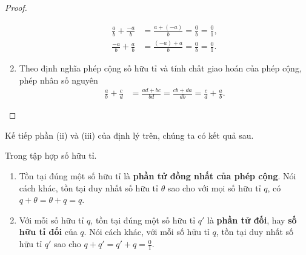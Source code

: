 \begin{proof}
\begin{enumerate}[label={(\roman*)}]
              \begin{align*}
                  \frac{a}{b} + \frac{-a}{b} & = \frac{a + (-a)}{b} = \frac{0}{b} = \frac{0}{1}, \\
                  \frac{-a}{b} + \frac{a}{b} & = \frac{(-a) + a}{b} = \frac{0}{b} = \frac{0}{1}.
              \end{align*}
        \item Theo định nghĩa phép cộng số hữu tỉ và tính chất giao hoán của phép cộng, phép nhân số nguyên
              \begin{align*}
                  \frac{a}{b} + \frac{c}{d} & = \frac{ad + bc}{bd} = \frac{cb + da}{db} = \frac{c}{d} + \frac{a}{b}.
              \end{align*}
    \end{enumerate}
\end{proof}

Kế tiếp phần (ii) và (iii) của định lý trên, chúng ta có kết quả sau.
\begin{theorem}\label{theorem:rational-numbers-additive-identity-and-additive-inverse}
    Trong tập hợp số hữu tỉ.
    \begin{enumerate}[label={(\roman*)}]
        \item Tồn tại đúng một số hữu tỉ là \textbf{phần tử đồng nhất của phép cộng}. Nói cách khác, tồn tại duy nhất số hữu tỉ $\theta$ sao cho với mọi số hữu tỉ $q$, có $q + \theta = \theta + q = q$.
        \item Với mỗi số hữu tỉ $q$, tồn tại đúng một số hữu tỉ $q'$ là \textbf{phần tử đối}, hay \textbf{số hữu tỉ đối} của $q$. Nói cách khác, với mỗi số hữu tỉ $q$, tồn tại duy nhất số hữu tỉ $q'$ sao cho $q + q' = q' + q = \frac{0}{1}$.
    \end{enumerate}
\end{theorem}

